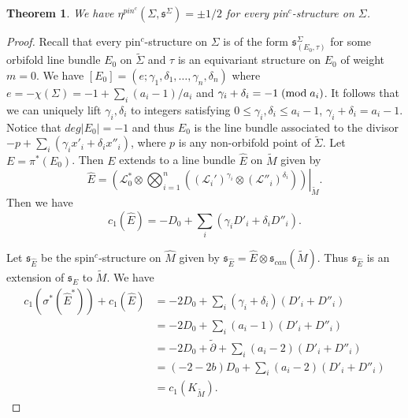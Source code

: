 \documentclass{amsart}
\newtheorem{theorem}{Theorem}[section]
\theoremstyle{definition}
\theoremstyle{remark}
\numberwithin{equation}{section}
\begin{document}
\begin{theorem}\label{thm:etapinc}
We have $\eta^{pin^c}(\Sigma , \mathfrak{s}^\Sigma) = \pm 1/2$ for every pin$^c$-structure on $\Sigma$.
\end{theorem}
\begin{proof}
Recall that every pin$^c$-structure on $\Sigma$ is of the form $\mathfrak{s}^\Sigma_{(E_0 , \tau)}$ for some orbifold line bundle $E_0$ on $\widetilde{\Sigma}$ and $\tau$ is an equivariant structure on $E_0$ of weight $m=0$. We have $[E_0] = (e ; \gamma_1 , \delta_1 , \dots , \gamma_n , \delta_n)$ where $e = -\chi(\Sigma) = -1 + \sum_i (a_i-1)/a_i$ and $\gamma_i + \delta_i = -1 \; ({\rm mod} \; a_i)$. It follows that we can uniquely lift $\gamma_i,\delta_i$ to integers satisfying $0 \le \gamma_i , \delta_i \le a_i - 1$, $\gamma_i + \delta_i = a_i - 1$. Notice that $deg|E_0| = -1$ and thus $E_0$ is the line bundle associated to the divisor $-p + \sum_i ( \gamma_i x'_i + \delta_i x''_i)$, where $p$ is any non-orbifold point of $\widetilde{\Sigma}$. Let $E = \pi^*(E_0)$. Then $E$ extends to a line bundle $\widehat{E}$ on $\widetilde{M}$ given by
\[
\widehat{E} = \left. \left( \mathcal{L}_0^{*} \otimes \bigotimes_{i=1}^n \left( (\mathcal{L}_i')^{\gamma_i} \otimes (\mathcal{L}''_i)^{\delta_i} \right) \right)\right|_{\widetilde{M}}.
\]
Then we have
\[
c_1( \widehat{E} ) = -D_0 + \sum_i (\gamma_i D'_i + \delta_i D''_i).
\]

Let $\mathfrak{s}_{\widehat{E}}$ be the spin$^c$-structure on $\widehat{M}$ given by $\mathfrak{s}_{\widehat{E}} = \widehat{E} \otimes \mathfrak{s}_{can}(\widetilde{M})$. Thus $\mathfrak{s}_{\widehat{E}}$ is an extension of $\mathfrak{s}_E$ to $\widetilde{M}$. We have
\begin{align*}
c_1( \sigma^*(\widehat{E}^*) ) + c_1(\widehat{E}) &= -2D_0 + \sum_i (  \gamma_i + \delta_i)(D'_i + D''_i) \\
&= -2D_0 + \sum_i ( a_i - 1 )(D'_i + D''_i) \\
&= -2D_0 + \widetilde{\partial} + \sum_i (a_i - 2)(D'_i + D''_i) \\
&= (-2-2b)D_0 + \sum_i (a_i - 2)(D'_i + D''_i) \\
&= c_1( K_{\widetilde{M}}).
\end{align*}


\end{proof}
\end{document}
